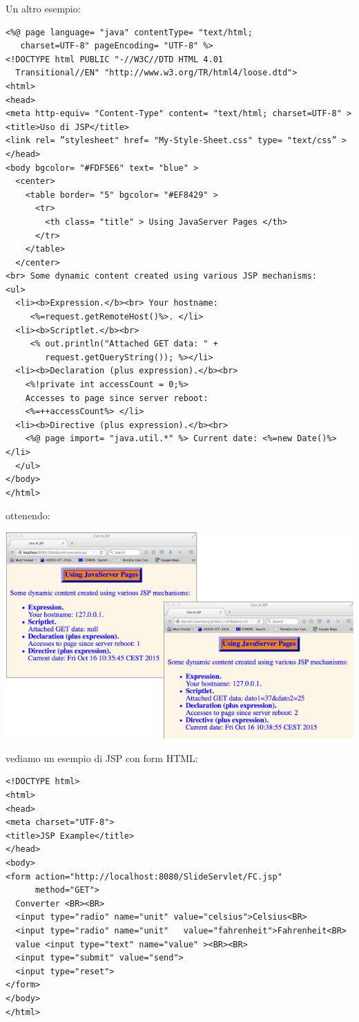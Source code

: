 \message{ !name(sd.tex)}\documentclass[a4paper,12pt, oneside]{book}
\begin{document}
Un altro esempio:
\begin{verbatim}
<%@ page language= "java" contentType= "text/html;
   charset=UTF-8" pageEncoding= "UTF-8" %>
<!DOCTYPE html PUBLIC "-//W3C//DTD HTML 4.01 
  Transitional//EN" "http://www.w3.org/TR/html4/loose.dtd">
<html>
<head>
<meta http-equiv= "Content-Type" content= "text/html; charset=UTF-8" >
<title>Uso di JSP</title>
<link rel= ”stylesheet" href= "My-Style-Sheet.css" type= "text/css” >
</head>
<body bgcolor= "#FDF5E6" text= "blue" >
  <center>
    <table border= "5" bgcolor= "#EF8429" >
      <tr>
        <th class= "title" > Using JavaServer Pages </th>
      </tr>
    </table>
  </center>
<br> Some dynamic content created using various JSP mechanisms:
<ul>
  <li><b>Expression.</b><br> Your hostname:
     <%=request.getRemoteHost()%>. </li>
  <li><b>Scriptlet.</b><br>
     <% out.println("Attached GET data: " +
        request.getQueryString()); %></li>
  <li><b>Declaration (plus expression).</b><br> 
    <%!private int accessCount = 0;%>
    Accesses to page since server reboot: 
    <%=++accessCount%> </li>
  <li><b>Directive (plus expression).</b><br>
    <%@ page import= "java.util.*" %> Current date: <%=new Date()%> </li>
  </ul>
</body>
</html> 
\end{verbatim}
ottenendo:
\begin{center}
	\includegraphics[scale=0.7]{img/jsp2.png}
\end{center}
vediamo un esempio di JSP con form HTML:
\begin{verbatim}
<!DOCTYPE html>
<html>
<head>
<meta charset="UTF-8">
<title>JSP Example</title>
</head>
<body>
<form action="http://localhost:8080/SlideServlet/FC.jsp"
      method="GET"> 
  Converter <BR><BR>
  <input type="radio" name="unit" value="celsius">Celsius<BR>
  <input type="radio" name="unit"   value="fahrenheit">Fahrenheit<BR>
  value <input type="text" name="value" ><BR><BR>
  <input type="submit" value="send">
  <input type="reset">
</form>
</body>
</html>
\end{verbatim}
\end{document}

